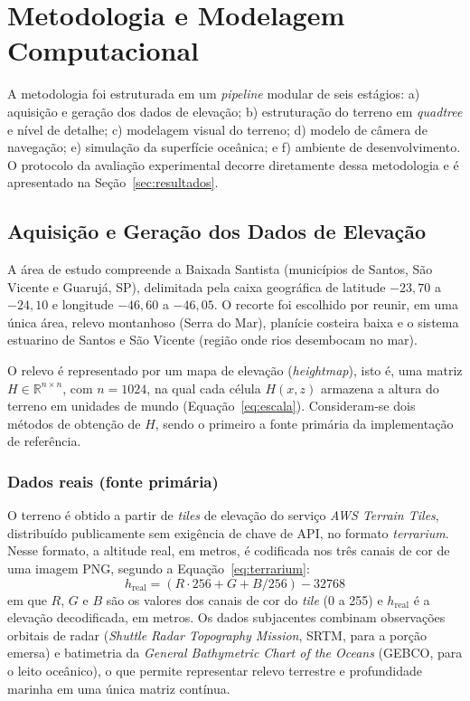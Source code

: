 \documentclass[conference]{IEEEtran}
\begin{document}
\section{Metodologia e Modelagem Computacional}
\label{sec:metod}

A metodologia foi estruturada em um \emph{pipeline} modular de seis
estágios: a) aquisição e geração dos dados de elevação; b) estruturação do
terreno em \emph{quadtree} e nível de detalhe; c) modelagem visual do
terreno; d) modelo de câmera de navegação; e) simulação da superfície
oceânica; e f) ambiente de desenvolvimento. O protocolo da avaliação experimental decorre
diretamente dessa metodologia e é apresentado na
Seção~\ref{sec:resultados}.

\subsection{Aquisição e Geração dos Dados de Elevação}
\label{sub:aquisicao}

A área de estudo compreende a Baixada Santista (municípios de Santos, São
Vicente e Guarujá, SP), delimitada pela caixa geográfica de latitude
$-23{,}70$ a $-24{,}10$ e longitude $-46{,}60$ a $-46{,}05$. O recorte foi
escolhido por reunir, em uma única área, relevo montanhoso (Serra do Mar),
planície costeira baixa e o sistema estuarino de Santos e São Vicente
(região onde rios desembocam no mar).

O relevo é representado por um mapa de elevação (\emph{heightmap}), isto é,
uma matriz $H \in \mathbb{R}^{n \times n}$, com $n = 1024$, na qual cada
célula $H(x,z)$ armazena a altura do terreno em unidades de mundo
(Equação~\eqref{eq:escala}). Consideram-se dois métodos
de obtenção de $H$, sendo o primeiro a fonte primária da implementação de
referência.

\subsubsection{Dados reais (fonte primária)}
O terreno é obtido a partir de \emph{tiles} de elevação do serviço
\emph{AWS Terrain Tiles}, distribuído publicamente sem exigência de chave
de API, no formato \emph{terrarium}. Nesse formato, a altitude real, em
metros, é codificada nos três canais de cor de uma imagem PNG, segundo a
Equação~\eqref{eq:terrarium}:
\begin{equation}
h_{\text{real}} = (R \cdot 256 + G + B/256) - 32768
\label{eq:terrarium}
\end{equation}
em que $R$, $G$ e $B$ são os valores dos canais de cor do \emph{tile}
(0 a 255) e $h_{\text{real}}$ é a elevação decodificada, em metros. Os dados
subjacentes combinam observações orbitais de radar (\emph{Shuttle Radar Topography
Mission}, SRTM, para a porção emersa) e batimetria da \emph{General
Bathymetric Chart of the Oceans} (GEBCO, para o leito oceânico), o que permite
representar relevo terrestre e profundidade marinha em uma única matriz
contínua.
\end{document}
